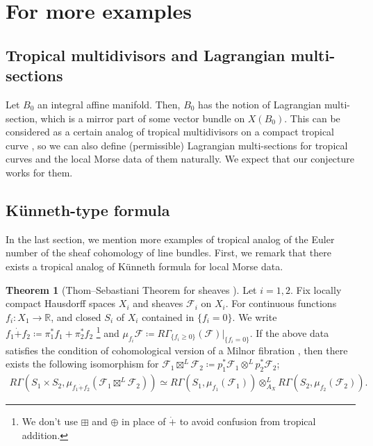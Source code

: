 \documentclass[a4paper,dvipdfmx,reqno,12pt]{amsart}
\theoremstyle{definition}
\newtheorem{theorem}{Theorem}[section]
\newcommand{\deq}{\coloneqq}
\newcommand{\mcal}[1]{\mathcal{#1}}%
\newcommand{\myfootnote}[1]{\hspace{-5pt}\footnote{#1}}
\numberwithin{equation}{section}
\begin{document}
\section{For more examples}

\subsection{Tropical multidivisors and 
Lagrangian multi-sections}
\label{section-tropical-multi-section}

Let $B_0$ an integral affine manifold. 
Then, $B_0$ has 
the notion of Lagrangian multi-section, 
which is a mirror part of some 
vector bundle on $X(B_0)$. 
This can be considered as a certain analog of  
tropical multidivisors on a compact tropical
curve \cite{gross2022principal}, so we 
can also define (permissible) 
Lagrangian multi-sections
for tropical curves and 
the local Morse data of them naturally.
We expect that our conjecture works for 
them.




\subsection{K\"unneth-type formula}


In the last section, we mention more examples of 
tropical analog of the Euler number of 
the sheaf cohomology of line bundles.
First, we remark that there exists
a tropical analog of K\"unneth formula for 
local Morse data.

\begin{theorem}[{Thom--Sebastiani Theorem for sheaves \cite[Theorem 1.2.2]{MR2031639}}]
Let $i=1,2$.
Fix locally compact Hausdorff spaces $X_i$ and 
sheaves $\mathcal{F}_i$ on $X_i$.
For continuous functions $f_i\colon X_1 \to\mathbb{R}$,
and closed $S_i$ of $X_i$ contained in $\{f_i=0\}$.
We write $f_1\dot{+} f_2\deq \pi_1^{*}f_1+\pi_2^{*}f_2$
\myfootnote{
We don't use $\boxplus$ and $\oplus$ in place of
$\dot{+}$
to avoid confusion from tropical addition.}
and 
$\mu_{f_i}\mathcal{F}\deq R\Gamma_{\{f_i\geq 0\}}
(\mathcal{F})|_{\{f_i=0\}}$.
If the above data satisfies
the condition of cohomological version of a Milnor 
fibration \cite[Assumption 1.1.1]{MR2031639},
then there exists the following isomorphism 
for $\mcal{F}_1\boxtimes^{L} \mcal{F}_2\deq 
p_1^{*}\mcal{F}_1\otimes^{L}p^{*}_2\mcal{F}_2$;
\begin{align}
    R\Gamma(S_1\times S_2,\mu_{f_1\dot{+}f_2}(\mcal{F}_1\boxtimes^{L} \mcal{F}_2))
    \simeq R\Gamma(S_1,\mu_{f_1}(\mcal{F}_1))
    \otimes^{L}_{A_X}R\Gamma(S_2,\mu_{f_2}(\mcal{F}_2)).
\end{align}

\end{theorem}
\end{document}

